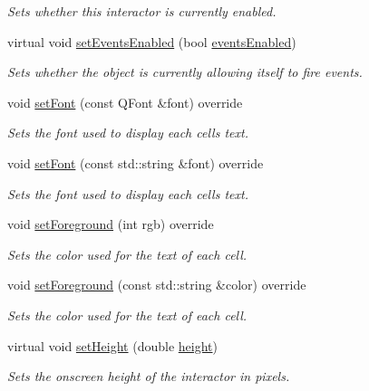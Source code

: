 \begin{DoxyCompactItemize}
\begin{DoxyCompactList}\small\item\em Sets whether this interactor is currently enabled. \end{DoxyCompactList}\item 
virtual void \mbox{\hyperlink{classGObservable_afaa30b2a9e0f378fd1c70d2f1d0b8216}{set\+Events\+Enabled}} (bool \mbox{\hyperlink{classGInteractor_a597a370b592e3737d38d9d2f4e2031ea}{events\+Enabled}})
\begin{DoxyCompactList}\small\item\em Sets whether the object is currently allowing itself to fire events. \end{DoxyCompactList}\item 
void \mbox{\hyperlink{classGTable_ad1d75b3840a41ba7d1e8a921696dc684}{set\+Font}} (const Q\+Font \&font) override
\begin{DoxyCompactList}\small\item\em Sets the font used to display each cell\textquotesingle{}s text. \end{DoxyCompactList}\item 
void \mbox{\hyperlink{classGTable_a51367c9fd2709973b1f7238734f93891}{set\+Font}} (const std\+::string \&font) override
\begin{DoxyCompactList}\small\item\em Sets the font used to display each cell\textquotesingle{}s text. \end{DoxyCompactList}\item 
void \mbox{\hyperlink{classGTable_a59f7cd2bd1708c12dfa52a8f7c7b79c9}{set\+Foreground}} (int rgb) override
\begin{DoxyCompactList}\small\item\em Sets the color used for the text of each cell. \end{DoxyCompactList}\item 
void \mbox{\hyperlink{classGTable_a8afbcf1f47750fb4c717f9ff36540235}{set\+Foreground}} (const std\+::string \&color) override
\begin{DoxyCompactList}\small\item\em Sets the color used for the text of each cell. \end{DoxyCompactList}\item 
virtual void \mbox{\hyperlink{classGInteractor_a9e280bfc4544dfaf8e4376c4e1a74357}{set\+Height}} (double \mbox{\hyperlink{classGTable_ad3774f6419003470f54fd495124ef51f}{height}})
\begin{DoxyCompactList}\small\item\em Sets the onscreen height of the interactor in pixels. \end{DoxyCompactList}\item 

\end{DoxyCompactItemize}
